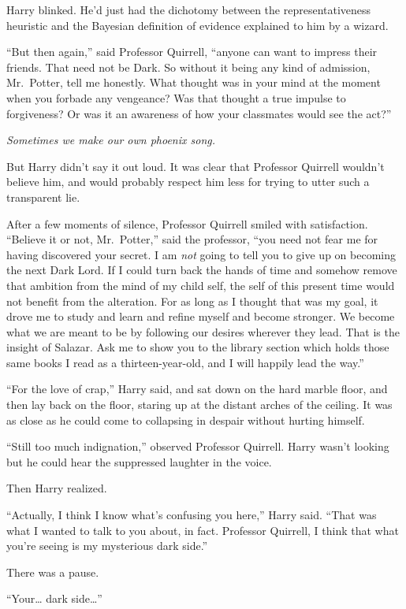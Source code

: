 Harry blinked. He'd just had the dichotomy between the
representativeness heuristic and the Bayesian definition of evidence
explained to him by a wizard.

``But then again,'' said Professor Quirrell, ``anyone can want to
impress their friends. That need not be Dark. So without it being any
kind of admission, Mr.~Potter, tell me honestly. What thought was in
your mind at the moment when you forbade any vengeance? Was that thought
a true impulse to forgiveness? Or was it an awareness of how your
classmates would see the act?''

\emph{Sometimes we make our own phoenix song.}

But Harry didn't say it out loud. It was clear that Professor Quirrell
wouldn't believe him, and would probably respect him less for trying to
utter such a transparent lie.

After a few moments of silence, Professor Quirrell smiled with
satisfaction. ``Believe it or not, Mr.~Potter,'' said the professor,
``you need not fear me for having discovered your secret. I am
\emph{not} going to tell you to give up on becoming the next Dark Lord.
If I could turn back the hands of time and somehow remove that ambition
from the mind of my child self, the self of this present time would not
benefit from the alteration. For as long as I thought that was my goal,
it drove me to study and learn and refine myself and become stronger. We
become what we are meant to be by following our desires wherever they
lead. That is the insight of Salazar. Ask me to show you to the library
section which holds those same books I read as a thirteen-year-old, and
I will happily lead the way.''

``For the love of crap,'' Harry said, and sat down on the hard marble
floor, and then lay back on the floor, staring up at the distant arches
of the ceiling. It was as close as he could come to collapsing in
despair without hurting himself.

``Still too much indignation,'' observed Professor Quirrell. Harry
wasn't looking but he could hear the suppressed laughter in the voice.

Then Harry realized.

``Actually, I think I know what's confusing you here,'' Harry said.
``That was what I wanted to talk to you about, in fact. Professor
Quirrell, I think that what you're seeing is my mysterious dark side.''

There was a pause.

``Your\ldots{} dark side\ldots{}''

